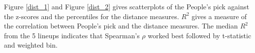 \documentclass[12]{report}
\begin{document}
Figure \ref{dist_1} and Figure \ref{dist_2} gives scatterplots of the People's pick against the z-scores and the percentiles for the distance measures. $R^2$ gives a measure of the correlation between People's pick and the distance measures. The median $R^2$ from the 5 lineups indicates that Spearman's $\rho$ worked best followed by t-statistic and weighted bin.


%

%
\end{document}
